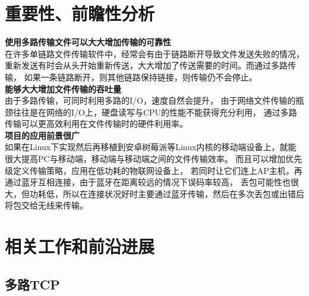 \documentclass[11pt]{article}
\begin{document}
\section{重要性、前瞻性分析}
\textbf{使用多路传输文件可以大大增加传输的可靠性}\\
在许多单链路文件传输软件中，经常会有由于链路断开导致文件发送失败的情况，
重新发送有时会从头开始重新传送，大大增加了传送需要的时间。而通过多路传输，
如果一条链路断开，则其他链路保持链接，则传输仍不会停止。
\\
\textbf{能够大大增加文件传输的吞吐量}\\
由于多路传输，可同时利用多路的I/O，速度自然会提升，
由于网络文件传输的瓶颈往往是在网络的I/O上，硬盘读写与CPU的性能不能获得充分利用，
通过多路传输可以更高效利用在文件传输时的硬件利用率。
\\
\textbf{项目的应用前景很广}\\
如果在Linux下实现然后再移植到安卓树莓派等Linux内核的移动端设备上，就能很大提高PC与移动端，移动端与移动端之间的文件传输效率。
而且可以增加优先级定义传输策略，应用在低功耗的物联网设备上，
若同时让它们连上AP主机，再通过蓝牙互相连接，由于蓝牙在距离较远的情况下误码率较高，
丢包可能性也很大，但功耗低，所以在连接状况好时主要通过蓝牙传输，然后在多次丢包或出错后将包交给无线来传输。
\section{相关工作和前沿进展}
\subsection{多路TCP}
\end{document}
